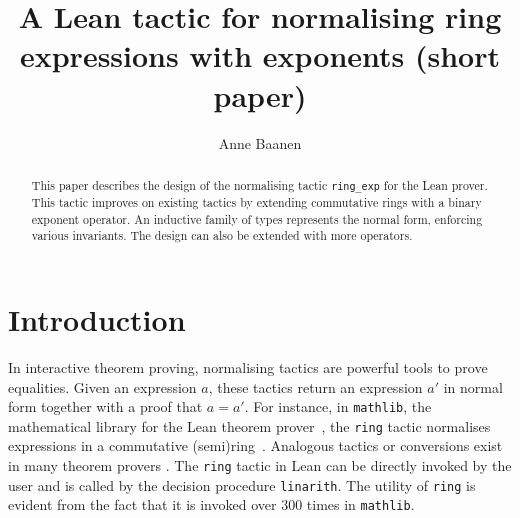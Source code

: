 \documentclass{llncs}
\title{A Lean tactic for normalising ring\\ expressions with exponents (short paper)}
\author{Anne Baanen}
\institute{Vrije Universiteit Amsterdam, Amsterdam, The Netherlands\\\email{t.baanen@vu.nl}}
\newcommand{\lean}[1]{\texttt{#1}\xspace} %
\newcommand{\mathlib}{\texttt{mathlib}\xspace}
\newcommand{\ring}{\lean{ring}}
\newcommand{\ringexp}{\lean{ring\_exp}}
\begin{document}
\maketitle

\begin{abstract}
This paper describes the design of the normalising tactic \ringexp for the Lean prover.
This tactic improves on existing tactics by extending commutative rings with a binary exponent operator.
An inductive family of types represents the normal form, enforcing various invariants.
The design can also be extended with more operators.
\end{abstract}

\section{Introduction}

In interactive theorem proving, normalising tactics are powerful tools to prove equalities.
Given an expression $a$, these tactics return an expression $a'$ in normal form together with a proof that $a = a'$.
For instance, in \mathlib, the mathematical library for the Lean theorem prover~\cite{lean-prover},
the \ring tactic normalises %
expressions in a commutative (semi)ring~\cite{mathlib}.
Analogous tactics or conversions exist in many theorem provers \cite{agda-stdlib, hol_light, isabelle_hol}.
The \ring tactic in Lean can be directly invoked by the user
and is called by the decision procedure \lean{linarith}.
The utility of \ring is evident from the fact that it is invoked over 300 times in \mathlib.
\end{document}
